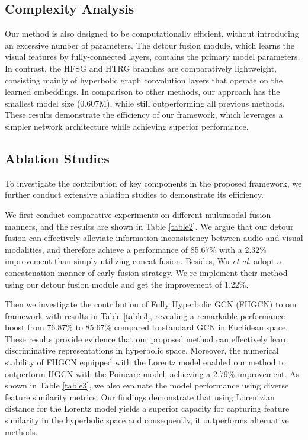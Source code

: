 \documentclass[sigconf]{acmart}
\newcommand{\etal}{{\emph{et al. }}}
\begin{document}
\subsection{Complexity Analysis}
Our method is also designed to be computationally efficient, without introducing an excessive number of parameters. The detour fusion module, which learns the visual features by fully-connected layers, contains the primary model parameters. In contrast, the HFSG and HTRG branches are comparatively lightweight, consisting mainly of hyperbolic graph convolution layers that operate on the learned embeddings. In comparison to other methods, our approach has the smallest model size (0.607M), while still outperforming all previous methods. These results demonstrate the efficiency of our framework, which leverages a simpler network architecture while achieving superior performance.





\subsection{Ablation Studies}
To investigate the contribution of key components in the proposed framework, we further conduct extensive ablation studies to demonstrate its efficiency. 

We first conduct comparative experiments on different multimodal fusion manners, and the results are shown in Table \ref{table2}. We argue that our detour fusion can effectively alleviate information inconsistency between audio and visual modalities, and therefore achieve a performance of 85.67\% with a 2.32\% improvement than simply utilizing concat fusion. Besides, Wu \etal \cite{c:2} adopt a concatenation manner of early fusion strategy. We re-implement their method using our detour fusion module and get the improvement of 1.22\%.

Then we investigate the contribution of Fully Hyperbolic GCN (FHGCN) to our framework with results in Table \ref{table3}, revealing a remarkable performance boost from 76.87\% to 85.67\% compared to standard GCN in Euclidean space. These results provide evidence that our proposed method can effectively learn discriminative representations in hyperbolic space. Moreover, the numerical stability of FHGCN equipped with the Lorentz model enabled our method to outperform HGCN with the Poincare model, achieving a 2.79\% improvement. As shown in Table \ref{table3},  we also evaluate the model performance using diverse feature similarity metrics. Our findings demonstrate that using Lorentzian distance for the Lorentz model yields a superior capacity for capturing feature similarity in the hyperbolic space and consequently, it outperforms alternative methods.
\end{document}
